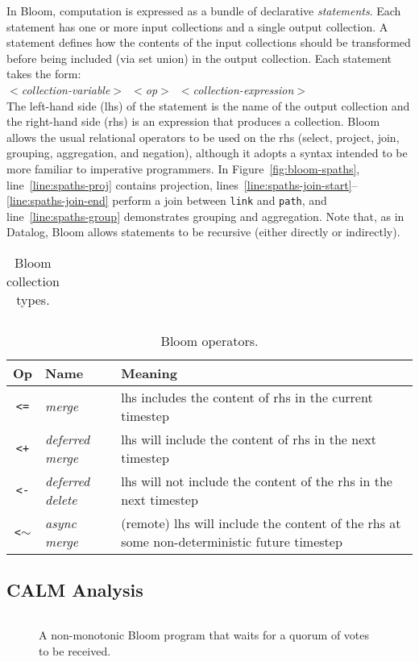 In Bloom, computation is expressed as a bundle of declarative
\emph{statements}. Each statement has one or more input collections and a single
output collection. A statement defines how the contents of the input
collections should be transformed before being included (via set union) in the
output collection. Each statement takes the form: \\ \noindent
\mbox{\hspace{0.25in}\emph{$<$collection-variable$>$ $<$op$>$
    $<$collection-expression$>$}}\\ \noindent
The left-hand side (lhs) of the statement is the name of the output collection
and the right-hand side (rhs) is an expression that produces a collection. Bloom
allows the usual relational operators to be used on the rhs (select, project,
join, grouping, aggregation, and negation), although it adopts a syntax intended
to be more familiar to imperative programmers. In Figure~\ref{fig:bloom-spaths},
line~\ref{line:spaths-proj} contains projection,
lines~\ref{line:spaths-join-start}--\ref{line:spaths-join-end} perform a join
between \texttt{link} and \texttt{path}, and line~\ref{line:spaths-group}
demonstrates grouping and aggregation. Note that, as in Datalog, Bloom allows
statements to be recursive (either directly or
indirectly). %

\begin{table}
\begin{tabular}{|c|l|}
\end{tabular}
\caption{Bloom collection types.}
\label{tbl:bloom-collections}
\end{table}

\begin{table}
\begin{tabular}{|c|l|p{1.85in}|}
\hline
\textbf{Op} & \textbf{Name} & \textbf{Meaning} \\
\hline
\verb|<=| & \emph{merge} & lhs includes the content of rhs in the
current timestep \\
\hline
\verb|<+| & \emph{deferred merge} & lhs will include the content of rhs in the
next timestep \\
\hline
\verb|<-| & \emph{deferred delete} & lhs will not include the content of the rhs
in the next timestep \\
\hline
\verb|<|$\sim$ & \emph{async merge} & (remote) lhs will include the content of the
rhs at some non-deterministic future timestep\\
\hline
\end{tabular}
\caption{Bloom operators.}
\label{tbl:bloom-ops}
\end{table}

\subsection{CALM Analysis}
\label{sec:bg-calm}

\begin{figure}[t]
\begin{scriptsize}
\begin{lstlisting}
\end{lstlisting}
\end{scriptsize}
\caption{A non-monotonic Bloom program that waits for a quorum of votes to be received.}
\label{fig:bloom-nm-quorum}
\end{figure}
